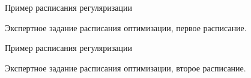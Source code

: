 \documentclass[9pt,pdf,hyperref={unicode}]{beamer}
\begin{document}
\begin{frame}{Пример расписания регуляризации}
\begin{center}
\begin{figure}[h!]

\label{fig:opt schedule 1}
\end{figure}
Экспертное задание расписания оптимизации, первое расписание.
\end{center}
\end{frame}

\begin{frame}{Пример расписания регуляризации}
\begin{center}
\begin{figure}[h!]

\label{fig:opt schedule 2}
\end{figure}
Экспертное задание расписания оптимизации, второе расписание.
\end{center}
\end{frame}
\end{document}

